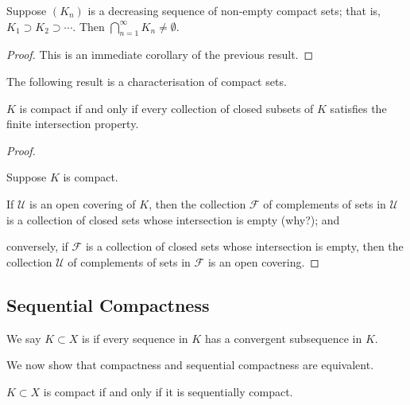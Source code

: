 \begin{theorem}\label{thrm:cantor-intersection}
Suppose $(K_n)$ is a decreasing sequence of non-empty compact sets; that is, $K_1\supset K_2\supset\cdots$. Then $\bigcap_{n=1}^\infty K_n\neq\emptyset$.
\end{theorem}

\begin{proof}
This is an immediate corollary of the previous result.
\end{proof}

The following result is a characterisation of compact sets.

\begin{proposition}
$K$ is compact if and only if every collection of closed subsets of $K$ satisfies the finite intersection property.
\end{proposition}

\begin{proof} \

\forward Suppose $K$ is compact.

If $\mathcal{U}$ is an open covering of $K$, then the collection $\mathcal{F}$ of complements of sets in $\mathcal{U}$ is a collection of closed sets whose intersection is empty (why?); and 

conversely, if $\mathcal{F}$ is a collection of closed sets whose intersection is empty, then the collection $\mathcal{U}$ of complements of sets in $\mathcal{F}$ is an open covering.

\end{proof}
\pagebreak

\subsection{Sequential Compactness}
\begin{definition}
We say $K\subset X$ is  if every sequence in $K$ has a convergent subsequence in $K$.
\end{definition}

We now show that compactness and sequential compactness are equivalent.

\begin{proposition}
$K\subset X$ is compact if and only if it is sequentially compact.
\end{proposition}

